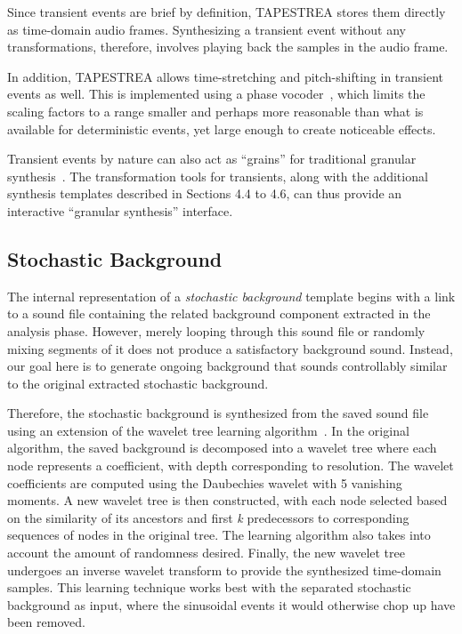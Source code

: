 \documentclass[10pt,letterpaper]{article}
\begin{document}
Since transient events are brief by definition, TAPESTREA stores them
directly as time-domain audio frames. Synthesizing a transient event
without any transformations, therefore, involves playing back the
samples in the audio frame. 

In addition, TAPESTREA allows time-stretching and pitch-shifting in
transient events as well. This is implemented using a phase
vocoder~\cite{Dolson86}, which limits the scaling factors to a range smaller
and perhaps more reasonable than what is available for deterministic events,
yet large enough to create noticeable effects.

Transient events by nature can also act as ``grains'' for traditional
granular synthesis~\cite{Truax90,Roads02}. The
transformation tools for transients, along with the
additional synthesis templates described in Sections 4.4 to 4.6, can
thus provide an interactive ``granular synthesis'' interface.

\subsection{Stochastic Background}

The internal representation of a \textit{stochastic background} template
begins with a link to a sound file containing the related background
component extracted in the analysis phase. However, merely looping
through this sound file or randomly mixing segments of it does not
produce a satisfactory background sound. Instead, our goal here is to
generate ongoing background that sounds controllably similar to the
original extracted stochastic background. 

Therefore, the stochastic background is synthesized from the saved sound
file using an extension of the wavelet tree learning
algorithm~. In the original algorithm, the saved
background is decomposed into a wavelet tree where each node
represents a coefficient, with depth corresponding to resolution.
The wavelet coefficients are computed using the Daubechies wavelet with 5
vanishing moments. A new wavelet tree is then constructed, with each node selected
based on the similarity of its ancestors and first \textit{k} predecessors to
corresponding sequences of nodes in the original tree. The learning
algorithm also takes into account the amount of randomness desired. Finally,
the new wavelet tree undergoes an inverse wavelet transform to provide the
synthesized time-domain samples. This learning technique works best with
the separated stochastic background as input, where the sinusoidal events it
would otherwise chop up have been removed.
\end{document}
